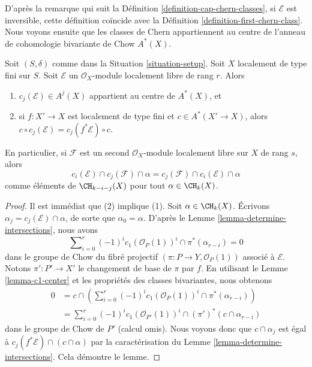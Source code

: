 \noindent
D'après la remarque qui suit la Définition \ref{definition-cap-chern-classes},
si $\mathcal{E}$ est inversible, cette définition coïncide avec la
Définition \ref{definition-first-chern-class}.
Nous voyons ensuite que les classes de Chern appartiennent au centre de l'anneau de
cohomologie bivariante de Chow $A^*(X)$.

\begin{lemma}
\label{lemma-cap-commutative-chern}
Soit $(S, \delta)$ comme dans la Situation \ref{situation-setup}.
Soit $X$ localement de type fini sur $S$.
Soit $\mathcal{E}$ un $\mathcal{O}_X$-module localement libre de rang $r$.
Alors
\begin{enumerate}
\item $c_j(\mathcal{E}) \in A^j(X)$ appartient au centre de $A^*(X)$, et
\item si $f : X' \to X$ est localement de type fini et $c \in A^*(X' \to X)$,
alors $c \circ c_j(\mathcal{E}) = c_j(f^*\mathcal{E}) \circ c$.
\end{enumerate}
En particulier, si $\mathcal{F}$ est un second
$\mathcal{O}_X$-module localement libre sur $X$ de rang $s$, alors
$$
c_i(\mathcal{E}) \cap c_j(\mathcal{F}) \cap \alpha
=
c_j(\mathcal{F}) \cap c_i(\mathcal{E}) \cap \alpha
$$
comme éléments de $\CH_{k - i - j}(X)$ pour tout $\alpha \in \CH_k(X)$.
\end{lemma}

\begin{proof}
Il est immédiat que (2) implique (1).
Soit $\alpha \in \CH_k(X)$. Écrivons $\alpha_j = c_j(\mathcal{E}) \cap \alpha$, de sorte que
$\alpha_0 = \alpha$. D'après le Lemme \ref{lemma-determine-intersections}, nous avons
$$
\sum\nolimits_{i = 0}^r
(-1)^i c_1(\mathcal{O}_P(1))^i \cap
\pi^*(\alpha_{r - i}) = 0
$$
dans le groupe de Chow du fibré projectif
$(\pi : P \to Y, \mathcal{O}_P(1))$
associé à $\mathcal{E}$. Notons $\pi' : P' \to X'$ le changement de base
de $\pi$ par $f$. En utilisant le Lemme \ref{lemma-c1-center} et
les propriétés des classes bivariantes, nous obtenons
\begin{align*}
0 & = c \cap \left(\sum\nolimits_{i = 0}^r
(-1)^i c_1(\mathcal{O}_P(1))^i \cap
\pi^*(\alpha_{r - i})\right) \\
& =
\sum\nolimits_{i = 0}^r
(-1)^i c_1(\mathcal{O}_{P'}(1))^i \cap
(\pi')^*(c \cap \alpha_{r - i})
\end{align*}
dans le groupe de Chow de $P'$ (calcul omis).
Nous voyons donc que $c \cap \alpha_j$ est
égal à $c_j(f^*\mathcal{E}) \cap (c \cap \alpha)$ par la caractérisation
du Lemme \ref{lemma-determine-intersections}.
Cela démontre le lemme.
\end{proof}

